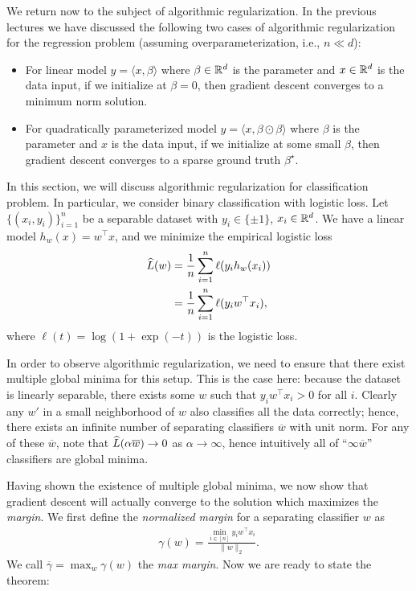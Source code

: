 We return now to the subject of algorithmic regularization. In the previous lectures we have discussed the following two cases of algorithmic regularization for the regression problem (assuming overparameterization, i.e.,  $n \ll d$):
\begin{itemize}
\item For linear model $y = \langle x, \beta \rangle$ where $\beta \in \mathbb R^d$ is the parameter and $x \in \mathbb R^d$ is the data input, if we initialize at $\beta=0$, then gradient descent converges to a minimum norm solution.

\item For quadratically parameterized model $y = \langle x, \beta \odot \beta \rangle$ where $\beta$ is the parameter and $x$ is the data input, if we initialize at some small $\beta$, then gradient descent converges to a sparse ground truth $\beta^\star$.
\end{itemize}

In this section, we will discuss algorithmic regularization for classification problem. In particular, we consider binary classification with logistic loss. Let $\{(x_i, y_i)\}_{i=1}^n$ be a separable dataset with $y_i\in \{\pm 1\}$, $x_i\in \mathbb R^d$. We have a linear model $h_w(x) = w^\top x$, and we minimize the empirical logistic loss 
\begin{align}
	\widehat{L} (w) &= \frac{1}{n} \sum_{i=1}^{n} \ell(y_i h_w(x_i))\\
	&= \frac{1}{n} \sum_{i=1}^{n} \ell(y_i w^\top x_i),
\end{align}
where $\ell(t) = \log(1+\exp(-t))$ is the logistic loss.

In order to observe algorithmic regularization, we need to ensure that there exist multiple global minima for this setup. This is the case here: because the dataset is linearly separable, there exists some $w$ such that $y_i w^\top x_i > 0$ for all $i$. Clearly any $w'$ in a small neighborhood of $w$ also classifies all the data correctly; hence, there exists an infinite number of separating classifiers $\overline{w}$ with unit norm. For any of these $\overline{w}$, note that $\widehat{L}(\alpha\overline{w}) \rightarrow 0$ as $\alpha \rightarrow \infty$, hence intuitively all of ``$\infty \overline{w}$'' classifiers are global minima.

Having shown the existence of multiple global minima, we now show that gradient descent will actually converge to the solution which maximizes the \textit{margin}. We first define the \textit{normalized margin} for a separating classifier $w$ as
\begin{align}
	\gamma(w) = \frac{\min_{i\in [n]} y_iw^\top x_i }{\|w\|_2}.
\end{align}
We call $\overline{\gamma} = \max_w \gamma(w)$ the \textit{max margin}. Now we are ready to state the theorem:

